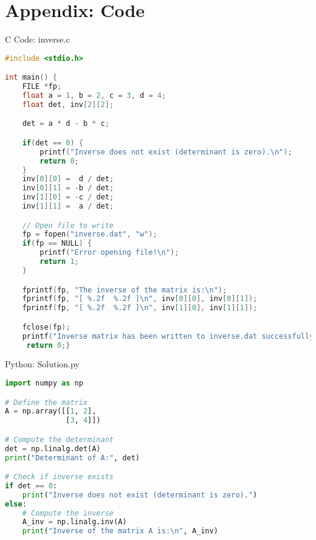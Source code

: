 \documentclass{beamer}
\numberwithin{equation}{section}
\theoremstyle{remark}
\begin{document}
\section*{Appendix: Code}

\begin{frame}[fragile]{C Code: inverse.c}
\begin{lstlisting}[language=C]
#include <stdio.h>

int main() {
    FILE *fp;
    float a = 1, b = 2, c = 3, d = 4;
    float det, inv[2][2];

    det = a * d - b * c;

    if(det == 0) {
        printf("Inverse does not exist (determinant is zero).\n");
        return 0;
    }
    inv[0][0] =  d / det;
    inv[0][1] = -b / det;
    inv[1][0] = -c / det;
    inv[1][1] =  a / det;

    // Open file to write
    fp = fopen("inverse.dat", "w");
    if(fp == NULL) {
        printf("Error opening file!\n");
        return 1;
    }

    fprintf(fp, "The inverse of the matrix is:\n");
    fprintf(fp, "[ %.2f  %.2f ]\n", inv[0][0], inv[0][1]);
    fprintf(fp, "[ %.2f  %.2f ]\n", inv[1][0], inv[1][1]);

    fclose(fp);
    printf("Inverse matrix has been written to inverse.dat successfully.\n");
     return 0;}


                \end{lstlisting}
\end{frame}

\begin{frame}[fragile]{Python: Solution.py}
\begin{lstlisting}[language=Python]
import numpy as np

# Define the matrix
A = np.array([[1, 2],
              [3, 4]])

# Compute the determinant
det = np.linalg.det(A)
print("Determinant of A:", det)

# Check if inverse exists
if det == 0:
    print("Inverse does not exist (determinant is zero).")
else:
    # Compute the inverse
    A_inv = np.linalg.inv(A)
    print("Inverse of the matrix A is:\n", A_inv)

\end{lstlisting}
\end{frame}
\end{document}
